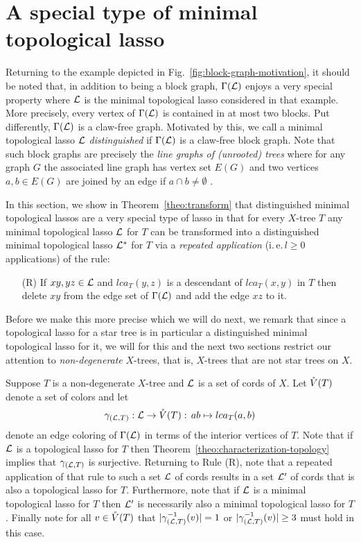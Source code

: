 
\section{A special type of minimal 
topological lasso} \label{sec:distinguished}

Returning to the example depicted in Fig.~\ref{fig:block-graph-motivation},
it should be noted that, in addition to being a block graph,
 $\Gamma({\mathcal L})$ enjoys a very special
property where ${\mathcal L}$ is the minimal topological lasso considered in
that example. More precisely, every vertex of $\Gamma({\mathcal L})$
is contained in at most two blocks. 
Put differently, $\Gamma({\mathcal L})$ is a claw-free graph. Motivated by this, we
call a minimal topological lasso ${\mathcal L}$ {\em distinguished} if
$\Gamma({\mathcal L})$ is a claw-free block graph.  Note that such
block graphs are precisely the
{\em line graphs of (unrooted) trees} where for any graph $G$ the
associated line graph has vertex set $E(G)$ and two vertices
$a,b\in E(G)$ are joined by an edge if $a\cap b\not=\emptyset$ \cite{H72}.  

In this section, we show in Theorem~\ref{theo:transform}
that distinguished minimal topological 
lassos are a very special type of lasso in that for
every $X$-tree $T$ any minimal topological lasso ${\mathcal L}$ for $T$
can be transformed into a distinguished
minimal topological lasso 
${\mathcal L}^*$ for $T$ via a {\em repeated
application} (i.\,e.\,$l\geq 0$ applications) of the rule: 

\begin{enumerate}
\item[(R)] If $xy,yz\in {\mathcal L}$ and $lca_T(y,z)$ is a descendant of  
$lca_T(x,y)$ in $T$ then delete $xy$ from the edge set of $\Gamma({\mathcal L})$
and add the edge $xz$ to it. 
\end{enumerate}

Before we make this more precise which we will do next, we remark 
that since a topological lasso for a star tree
is in particular a distinguished minimal topological
lasso for it,  we will for this and the next two sections 
restrict our attention to {\em non-degenerate} $X$-trees,
that is, $X$-trees that are not star trees on $X$.

Suppose $T$ is a non-degenerate $X$-tree and ${\mathcal L}$
is a set of cords of $X$. Let $\mathring{V}(T)$ denote
a set of colors and let 
$$
\gamma_{({\mathcal L},T)}:{\mathcal L}\to \mathring{V}(T):\, ab\mapsto lca_T(a,b)
$$
denote an edge coloring of $\Gamma({\mathcal L})$
in terms of the interior vertices of $T$. Note that
if ${\mathcal L}$ is a topological lasso for $T$
then Theorem~\ref{theo:characterization-topology} implies that
$\gamma_{({\mathcal L},T)}$ is surjective. Returning to Rule (R),
note that a repeated application of that rule to such a set ${\mathcal L}$ of cords
results in a  set ${\mathcal L}'$ of cords that is also a 
topological lasso for $T$. Furthermore, note that if ${\mathcal L}$ is a minimal
topological lasso for $T$ then ${\mathcal L}'$ is necessarily also a minimal 
topological lasso for $T$. Finally note for all $v\in \mathring{V}(T)$ that
$|\gamma_{({\mathcal L},T)}^{-1}(v)|=1$ or  
$|\gamma_{({\mathcal L},T)}^{-1}(v)|\geq 3$ must hold in this case.


